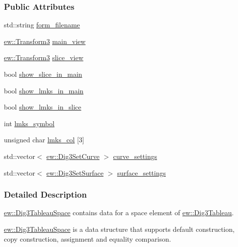 \subsubsection*{Public Attributes}
\begin{DoxyCompactItemize}
\item 
std::string \hyperlink{classew_1_1Dig3TableauSpace_adcdd8967b3b7217b151e30bf1c2540b1}{form\_\-filename}
\item 
\hyperlink{classew_1_1Transform3}{ew::Transform3} \hyperlink{classew_1_1Dig3TableauSpace_aeed5fbdecb68a567bdcb204cf954be6e}{main\_\-view}
\item 
\hyperlink{classew_1_1Transform3}{ew::Transform3} \hyperlink{classew_1_1Dig3TableauSpace_aaf9b84f70f9ab0db2d775e60d2d70a74}{slice\_\-view}
\item 
bool \hyperlink{classew_1_1Dig3TableauSpace_a8c8a902e9e636bffc8638c8105b3b5b4}{show\_\-slice\_\-in\_\-main}
\item 
bool \hyperlink{classew_1_1Dig3TableauSpace_a302c76a3185e05d1bc5b2954489004ec}{show\_\-lmks\_\-in\_\-main}
\item 
bool \hyperlink{classew_1_1Dig3TableauSpace_a20ff63b1ab1b18a7184db0e6850d6570}{show\_\-lmks\_\-in\_\-slice}
\item 
int \hyperlink{classew_1_1Dig3TableauSpace_ac5de6ceab785dc79b0b681757d33dc88}{lmks\_\-symbol}
\item 
unsigned char \hyperlink{classew_1_1Dig3TableauSpace_aaa01d6e4fc38104bd38fa7dbd01d4acc}{lmks\_\-col} \mbox{[}3\mbox{]}
\item 
std::vector$<$ \hyperlink{classew_1_1Dig3SetCurve}{ew::Dig3SetCurve} $>$ \hyperlink{classew_1_1Dig3TableauSpace_a7b0af5084b9e677080e6c82f63e0cfe8}{curve\_\-settings}
\item 
std::vector$<$ \hyperlink{classew_1_1Dig3SetSurface}{ew::Dig3SetSurface} $>$ \hyperlink{classew_1_1Dig3TableauSpace_a43e89ab62ea3974fd89e6054d227ecab}{surface\_\-settings}
\end{DoxyCompactItemize}


\subsubsection{Detailed Description}
\hyperlink{classew_1_1Dig3TableauSpace}{ew::Dig3TableauSpace} contains data for a space element of \hyperlink{classew_1_1Dig3Tableau}{ew::Dig3Tableau}.

\hyperlink{classew_1_1Dig3TableauSpace}{ew::Dig3TableauSpace} is a data structure that supports default construction, copy construction, assignment and equality comparison. 

